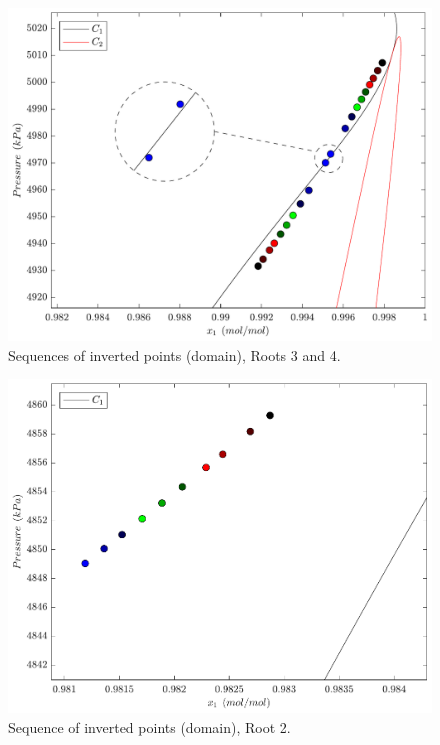 \documentclass{article}
\theoremstyle{definition}
\theoremstyle{remark}
\begin{document}
\begin{figure}
	\begin{center}
		\includegraphics[scale=0.50]{sequencia_pontos_dominio.pdf}
		\caption{Sequences of inverted points (domain), Roots 3 and 4.}\label{fig:points_domain_3_4}
	\end{center}
\end{figure}

\begin{figure}
	\begin{center}
		\includegraphics[scale=0.50]{sequencia_pontos_dominio_2.pdf}
		\caption{Sequence of inverted points (domain), Root 2.}\label{fig:points_domain_2}
	\end{center}
\end{figure}
\end{document}
